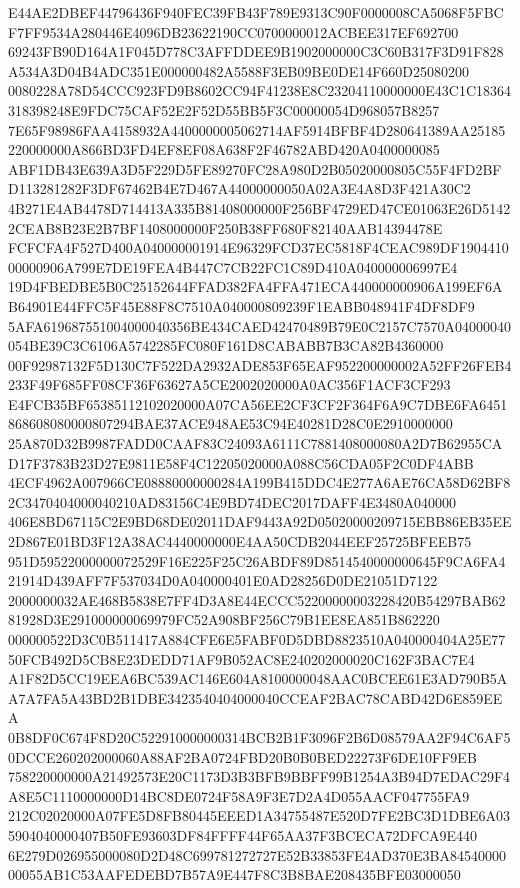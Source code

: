 \documentclass[UTF8,fontset=fandol,zihao=-4,a4paper]{ctexart}
\begin{document}
{{E44AE2DBEF44796436F940FEC39FB43F789E9313C90F0000008CA5068F5FBCF7FF9534A280446E4096DB23622190CC0700000012ACBEE317EF692700
69243FB90D164A1F045D778C3AFFDDEE9B1902000000C3C60B317F3D91F828A534A3D04B4ADC351E000000482A5588F3EB09BE0DE14F660D25080200
0080228A78D54CCC923FD9B8602CC94F41238E8C23204110000000E43C1C18364318398248E9FDC75CAF52E2F52D55BB5F3C00000054D968057B8257
7E65F98986FAA4158932A4400000005062714AF5914BFBF4D280641389AA25185220000000A866BD3FD4EF8EF08A638F2F46782ABD420A0400000085
ABF1DB43E639A3D5F229D5FE89270FC28A980D2B05020000805C55F4FD2BFD113281282F3DF67462B4E7D467A44000000050A02A3E4A8D3F421A30C2
4B271E4AB4478D714413A335B81408000000F256BF4729ED47CE01063E26D51422CEAB8B23E2B7BF1408000000F250B38FF680F82140AAB14394478E
FCFCFA4F527D400A040000001914E96329FCD37EC5818F4CEAC989DF190441000000906A799E7DE19FEA4B447C7CB22FC1C89D410A040000006997E4
19D4FBEDBE5B0C25152644FFAD382FA4FFA471ECA440000000906A199EF6AB64901E44FFC5F45E88F8C7510A040000809239F1EABB048941F4DF8DF9
5AFA619687551004000040356BE434CAED42470489B79E0C2157C7570A04000040054BE39C3C6106A5742285FC080F161D8CABABB7B3CA82B4360000
00F92987132F5D130C7F522DA2932ADE853F65EAF952200000002A52FF26FEB4233F49F685FF08CF36F63627A5CE2002020000A0AC356F1ACF3CF293
E4FCB35BF65385112102020000A07CA56EE2CF3CF2F364F6A9C7DBE6FA6451868608080000807294BAE37ACE948AE53C94E40281D28C0E2910000000
25A870D32B9987FADD0CAAF83C24093A6111C7881408000080A2D7B62955CAD17F3783B23D27E9811E58F4C12205020000A088C56CDA05F2C0DF4ABB
4ECF4962A007966CE08880000000284A199B415DDC4E277A6AE76CA58D62BF82C3470404000040210AD83156C4E9BD74DEC2017DAFF4E3480A040000
406E8BD67115C2E9BD68DE02011DAF9443A92D05020000209715EBB86EB35EE2D867E01BD3F12A38AC4440000000E4AA50CDB2044EEF25725BFEEB75
951D59522000000072529F16E225F25C26ABDF89D8514540000000645F9CA6FA421914D439AFF7F537034D0A040000401E0AD28256D0DE21051D7122
2000000032AE468B5838E7FF4D3A8E44ECCC52200000003228420B54297BAB6281928D3E291000000069979FC52A908BF256C79B1EE8EA851B862220
000000522D3C0B511417A884CFE6E5FABF0D5DBD8823510A040000404A25E7750FCB492D5CB8E23DEDD71AF9B052AC8E240202000020C162F3BAC7E4
A1F82D5CC19EEA6BC539AC146E604A8100000048AAC0BCEE61E3AD790B5AA7A7FA5A43BD2B1DBE3423540404000040CCEAF2BAC78CABD42D6E859EEA
0B8DF0C674F8D20C522910000000314BCB2B1F3096F2B6D08579AA2F94C6AF50DCCE260202000060A88AF2BA0724FBD20B0B0BED22273F6DE10FF9EB
758220000000A21492573E20C1173D3B3BFB9BBFF99B1254A3B94D7EDAC29F4A8E5C1110000000D14BC8DE0724F58A9F3E7D2A4D055AACF047755FA9
212C02020000A07FE5D8FB80445EEED1A34755487E520D7FE2BC3D1DBE6A035904040000407B50FE93603DF84FFFF44F65AA37F3BCECA72DFCA9E440
6E279D026955000080D2D48C699781272727E52B33853FE4AD370E3BA8454000000055AB1C53AAFEDEBD7B57A9E447F8C3B8BAE208435BFE03000050
}}
\end{document}
